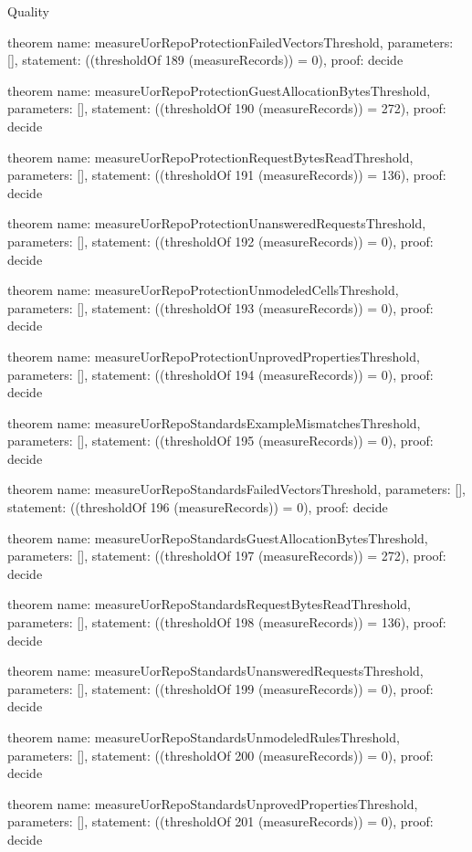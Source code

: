 \begin{lexlean}{Quality}
\begin{semanticmodule}
theorem{
  name: measureUorRepoProtectionFailedVectorsThreshold,
  parameters: [],
  statement: ((thresholdOf 189 (measureRecords)) = 0),
  proof: decide{}
}

theorem{
  name: measureUorRepoProtectionGuestAllocationBytesThreshold,
  parameters: [],
  statement: ((thresholdOf 190 (measureRecords)) = 272),
  proof: decide{}
}

theorem{
  name: measureUorRepoProtectionRequestBytesReadThreshold,
  parameters: [],
  statement: ((thresholdOf 191 (measureRecords)) = 136),
  proof: decide{}
}

theorem{
  name: measureUorRepoProtectionUnansweredRequestsThreshold,
  parameters: [],
  statement: ((thresholdOf 192 (measureRecords)) = 0),
  proof: decide{}
}

theorem{
  name: measureUorRepoProtectionUnmodeledCellsThreshold,
  parameters: [],
  statement: ((thresholdOf 193 (measureRecords)) = 0),
  proof: decide{}
}

theorem{
  name: measureUorRepoProtectionUnprovedPropertiesThreshold,
  parameters: [],
  statement: ((thresholdOf 194 (measureRecords)) = 0),
  proof: decide{}
}

theorem{
  name: measureUorRepoStandardsExampleMismatchesThreshold,
  parameters: [],
  statement: ((thresholdOf 195 (measureRecords)) = 0),
  proof: decide{}
}

theorem{
  name: measureUorRepoStandardsFailedVectorsThreshold,
  parameters: [],
  statement: ((thresholdOf 196 (measureRecords)) = 0),
  proof: decide{}
}

theorem{
  name: measureUorRepoStandardsGuestAllocationBytesThreshold,
  parameters: [],
  statement: ((thresholdOf 197 (measureRecords)) = 272),
  proof: decide{}
}

theorem{
  name: measureUorRepoStandardsRequestBytesReadThreshold,
  parameters: [],
  statement: ((thresholdOf 198 (measureRecords)) = 136),
  proof: decide{}
}

theorem{
  name: measureUorRepoStandardsUnansweredRequestsThreshold,
  parameters: [],
  statement: ((thresholdOf 199 (measureRecords)) = 0),
  proof: decide{}
}

theorem{
  name: measureUorRepoStandardsUnmodeledRulesThreshold,
  parameters: [],
  statement: ((thresholdOf 200 (measureRecords)) = 0),
  proof: decide{}
}

theorem{
  name: measureUorRepoStandardsUnprovedPropertiesThreshold,
  parameters: [],
  statement: ((thresholdOf 201 (measureRecords)) = 0),
  proof: decide{}
}


\end{semanticmodule}
\end{lexlean}
